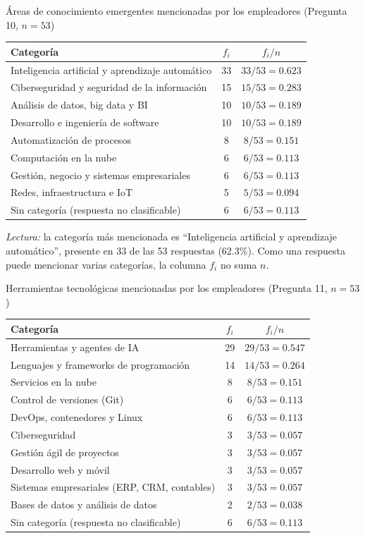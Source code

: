 \begin{mitabla}{Áreas de conocimiento emergentes mencionadas por los empleadores (Pregunta 10, $n=53$)}
\begin{tabular}{L{9cm}cc}
\toprule
Categoría & $f_i$ & $f_i/n$ \\
\midrule
Inteligencia artificial y aprendizaje automático & 33 & $33/53 = 0.623$ \\
Ciberseguridad y seguridad de la información & 15 & $15/53 = 0.283$ \\
Análisis de datos, big data y BI & 10 & $10/53 = 0.189$ \\
Desarrollo e ingeniería de software & 10 & $10/53 = 0.189$ \\
Automatización de procesos & 8 & $8/53 = 0.151$ \\
Computación en la nube & 6 & $6/53 = 0.113$ \\
Gestión, negocio y sistemas empresariales & 6 & $6/53 = 0.113$ \\
Redes, infraestructura e IoT & 5 & $5/53 = 0.094$ \\
\midrule
Sin categoría (respuesta no clasificable) & 6 & $6/53 = 0.113$ \\
\bottomrule
\end{tabular}
\end{mitabla}

\textit{Lectura:} la categoría más mencionada es ``Inteligencia artificial y aprendizaje automático'', presente en 33 de las 53 respuestas (62.3\%). Como una respuesta puede mencionar varias categorías, la columna $f_i$ no suma $n$.

\begin{mitabla}{Herramientas tecnológicas mencionadas por los empleadores (Pregunta 11, $n=53$)}
\begin{tabular}{L{9cm}cc}
\toprule
Categoría & $f_i$ & $f_i/n$ \\
\midrule
Herramientas y agentes de IA & 29 & $29/53 = 0.547$ \\
Lenguajes y frameworks de programación & 14 & $14/53 = 0.264$ \\
Servicios en la nube & 8 & $8/53 = 0.151$ \\
Control de versiones (Git) & 6 & $6/53 = 0.113$ \\
DevOps, contenedores y Linux & 6 & $6/53 = 0.113$ \\
Ciberseguridad & 3 & $3/53 = 0.057$ \\
Gestión ágil de proyectos & 3 & $3/53 = 0.057$ \\
Desarrollo web y móvil & 3 & $3/53 = 0.057$ \\
Sistemas empresariales (ERP, CRM, contables) & 3 & $3/53 = 0.057$ \\
Bases de datos y análisis de datos & 2 & $2/53 = 0.038$ \\
\midrule
Sin categoría (respuesta no clasificable) & 6 & $6/53 = 0.113$ \\
\bottomrule
\end{tabular}
\end{mitabla}

